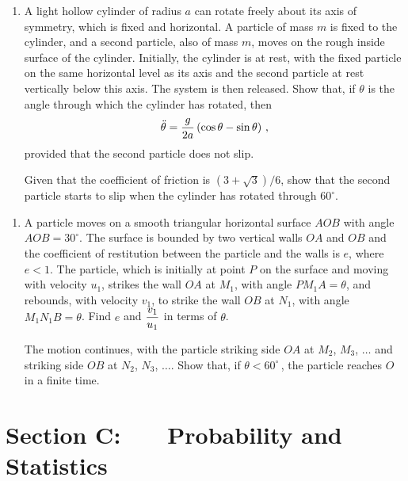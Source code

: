 \documentclass[a4, 11pt]{report}
\newlength{\qspace}
\newcounter{qnumber}
\newenvironment{question}%
 {\vspace{\qspace}
  \begin{enumerate}[\bfseries 1\quad][10]%
    \setcounter{enumi}{\value{qnumber}}%
    \item%
 }
{
  \end{enumerate}
  \filbreak
  \stepcounter{qnumber}
 }
\def\l{\left(}
\def\r{\right)}
\begin{document}
\begin{question}	
A light hollow cylinder of radius $a$ can rotate freely 
about its axis of symmetry, 
which is fixed and horizontal. 
A particle of mass $m$ is fixed to the cylinder, 
and a second particle, also of mass $m$, moves 
on the rough inside surface of the cylinder. 
Initially, the cylinder is at rest, 
with the fixed particle on the same horizontal level as its axis
and the second particle at rest vertically below this axis. 
The system is then released. 
Show that, if $\theta$ is the angle through which the cylinder has rotated, then
\[
\ddot{\theta} = {g \over 2a} \l \cos \theta - \sin \theta \r \,,
\]
provided that the second particle does not slip.

Given that the coefficient of friction is 
$ (3 + \sqrt{3})/6$, show that  the second particle 
starts to slip when the cylinder has rotated through $60^\circ$.
\end{question}


\begin{question}
A particle  moves on a smooth triangular horizontal surface  $AOB$ with angle 
$AOB = 30^\circ$. 
The surface  is bounded by two vertical walls 
$OA$ and $OB$ and the coefficient of restitution 
between the particle and the walls is $e$, where $e < 1$. 
The particle, which is initially at point $P$ on the surface 
and moving with velocity $u_1$, 
strikes the wall $OA$ at $M_1$, with angle $PM_1A = \theta$, and rebounds, 
with velocity $v_1$, to strike the wall $OB$ at $N_1$, 
with angle $M_1N_1B = \theta$. 
Find $e$ and $\displaystyle {v_1 \over u_1}$ in terms of $\theta$.

The motion continues, 
with the particle striking side $OA$ at $M_2$, $M_3$,   $ \ldots $ and striking 
side $OB$ at $N_2$, $N_3$,  $\ldots $. 
Show that, if $\theta < 60^\circ\,$, 
 the particle reaches $O$ in a finite time.  
\end{question}
	

	
	\newpage
\section*{Section C: \ \ \ Probability and Statistics}
\end{document}
